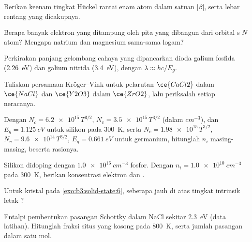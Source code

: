 \begin{exercise}[$\star$]\label{exo:b3:solid-state:1}
Berikan keenam tingkat Hückel rantai enam atom dalam satuan $|\beta|$, serta
lebar rentang yang dicakupnya.
\end{exercise}

\begin{exercise}[$\star$]\label{exo:b3:solid-state:2}
Berapa banyak elektron yang ditampung oleh pita yang dibangun dari orbital s $N$ atom? Mengapa
natrium dan magnesium sama-sama logam?
\end{exercise}

\begin{exercise}[$\star$]\label{exo:b3:solid-state:3}
Perkirakan panjang gelombang cahaya yang dipancarkan dioda galium fosfida
(\qty{2.26}{eV}) dan galium nitrida (\qty{3.4}{eV}), dengan $\lambda \approx hc/E_g$.
\end{exercise}

\begin{exercise}[$\star$]\label{exo:b3:solid-state:4}
Tuliskan persamaan Kröger--Vink untuk pelarutan $\ce{CaCl2}$ dalam $\ce{NaCl}$ dan $\ce{Y2O3}$ dalam $\ce{ZrO2}$, lalu
periksalah setiap neracanya.
\end{exercise}

\begin{exercise}[$\star\star$]\label{exo:b3:solid-state:5}
Dengan $N_c = \num{6.2e15}\,T^{3/2}$, $N_v = \num{3.5e15}\,T^{3/2}$ (dalam $\unit{cm^{-3}}$), dan $E_g = \qty{1.125}{eV}$ untuk silikon pada \qty{300}{K},
serta $N_c = \num{1.98e15}\,T^{3/2}$, $N_v = \num{9.6e14}\,T^{3/2}$, $E_g = \qty{0.661}{eV}$ untuk germanium, hitunglah $n_i$ masing-masing, beserta
rasionya.
\end{exercise}

\begin{exercise}[$\star\star$]\label{exo:b3:solid-state:6}
Silikon didoping dengan $\qty{1.0e16}{cm^{-3}}$ fosfor. Dengan $n_i = \qty{1.0e10}{cm^{-3}}$ pada \qty{300}{K}, berikan
konsentrasi elektron dan .
\end{exercise}

\begin{exercise}[$\star\star$]\label{exo:b3:solid-state:7}
Untuk kristal pada \cref{exo:b3:solid-state:6}, seberapa jauh di atas tingkat intrinsik
letak ?
\end{exercise}

\begin{exercise}[$\star\star$]\label{exo:b3:solid-state:8}
Entalpi pembentukan pasangan Schottky dalam NaCl sekitar \qty{2.3}{eV} (data
latihan). Hitunglah fraksi situs yang kosong pada \qty{800}{K}, serta jumlah
pasangan dalam satu mol.
\end{exercise}

